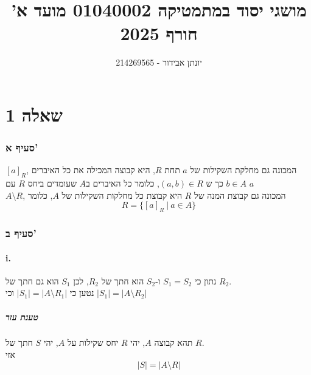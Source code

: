 \documentclass[12pt, titlepage]{article}
\title{מושגי יסוד במתמטיקה 01040002 מועד א' חורף 2025}
\author{יונתן אבידור - 214269565}
\begin{document}
\maketitle
\pagestyle{fancy}
\fancyhead{}
\part*{שאלה 1}
\section*{סעיף א'}
$\left[a\right]_R$, המכונה גם מחלקת השקילות של $a$ תחת $R$, היא קבוצה המכילה את כל האיברים $b\in A$ כך ש $\left(a,b\right) \in R$, כלומר כל האיברים ב$A$ שעומדים ביחס $R$ עם $a$\\
$A\setminus R$, המכונה גם קבוצת המנה של $R$ היא קבוצת כל מחלקות השקילות של $A$, כלומר
\[
    R=\bigl\{\left[a\right]_R~|~a\in A \bigr\}
\]
\section*{סעיף ב'}
\subsection*{i.}
נתון כי $S_1 = S_2$ ו-$S_2$ הוא חתך של $R_2$, לכן $S_1$ הוא גם חתך של $R_2$.\\
נטען כי $\left|S_1\right|=\left|A\setminus R_1\right|$ וכי $\left|S_1\right|=\left|A\setminus R_2\right|$
\subsubsection*{טענת עזר}
תהא קבוצה $A$, יהי $R$ יחס שקילות על $A$, יהי $S$ חתך של $R$.\\
אזי
\[
 \left|S\right|=\left|A\setminus R\right|
\]
\end{document}
